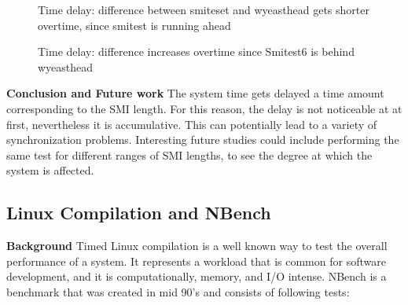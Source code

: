 \documentclass{IEEEtran}
\begin{document}
\begin{figure}[h]
\caption[Caption in ToC]{Time delay: difference between smiteset and wyeasthead gets shorter overtime, since smitest is running ahead}
\label{km_timedelay1}
\end{figure}

\begin{figure}[h]
\caption[Caption in ToC]{Time delay: difference increases overtime since Smitest6 is behind wyeasthead}
\label{km_timedelay2}
\end{figure}
\textbf{Conclusion and Future work}
The system time gets delayed a time amount corresponding to the SMI length. For this reason, the delay is not noticeable at at first, nevertheless it is accumulative. This can potentially lead to a variety of synchronization problems. Interesting future studies could include performing the same test for different ranges of SMI lengths, to see the degree at which the system is affected.

\subsection{Linux Compilation and NBench}\label{sub:km_performance}

\textbf{Background}
Timed Linux compilation is a well known way to test the overall performance of a system. It represents a workload that is common for software development, and it is computationally, memory, and I/O intense. NBench is a benchmark that was created in mid 90's and consists of following tests:\\
\end{document}
